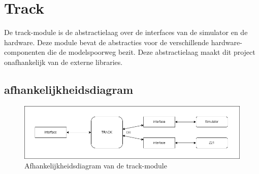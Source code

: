 \documentclass[a4paper, 11pt]{article}
\newcommand{\<}{\scriptsize\textless\normalsize}
\renewcommand{\>}{\scriptsize\textgreater\normalsize}
\begin{document}
\newpage
\section{Track} %
De track-module is de abstractielaag over de interfaces van de simulator en de hardware. Deze module bevat de abstracties voor de verschillende hardware-componenten die de modelspoorweg bezit. Deze abstractielaag maakt dit project onafhankelijk van de externe libraries.

\subsection{afhankelijkheidsdiagram} %
\begin{figure}[h]
	\begin{center}
		\includegraphics[scale=.5]{Afhankelijkheidsdiagrammen/track.png}
		\caption{Afhankelijkheidsdiagram van de track-module}
	\end{center}
\end{figure}

\end{document}

